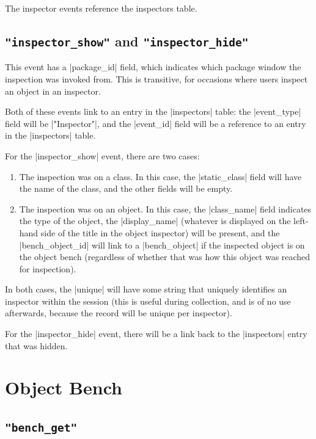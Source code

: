 \documentclass{report}
\begin{document}
The inspector events reference the inspectors table.


\subsection{\lstinline!"inspector_show"! and \lstinline!"inspector_hide"!}

This event has a |package_id| field, which indicates which package window the
inspection was invoked from.  This is transitive, for occasions where users
inspect an object in an inspector.

Both of these events link to an entry in the |inspectors| table: the
|event_type| field will be |"Inspector"|, and the |event_id| field will be a
reference to an entry in the |inspectors| table.

For the |inspector_show| event, there are two cases:

\begin{enumerate}
\item The inspection was on a class.  In this case, the |static_class| field
  will have the name of the class, and the other fields will be empty.
\item The inspection was on an object.  In this case, the |class_name| field
  indicates the type of the object, the |display_name| (whatever is displayed
  on the left-hand side of the title in the object inspector) will be present,
  and the |bench_object_id| will link to a |bench_object| if the inspected
  object is on the object bench (regardless of whether that was how this
  object was reached for inspection).
\end{enumerate}

In both cases, the |unique| will have some string that uniquely identifies an
inspector within the session (this is useful during collection, and is of no
use afterwards, because the record will be unique per inspector).

For the |inspector_hide| event, there will be a link back to the |inspectors|
entry that was hidden.

\section{Object Bench}

\subsection{\lstinline!"bench_get"!}
\end{document}
